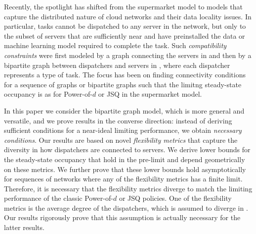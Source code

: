 \documentclass[a4paper, 12pt]{article}
\theoremstyle{definition}
\begin{document}
Recently, the spotlight has shifted from the supermarket model to models that capture the distributed nature of cloud networks and their data locality issues. In particular, tasks cannot be dispatched to any server in the network, but only to the subset of servers that are sufficiently near and have preinstalled the data or machine learning model required to complete the task. Such \emph{compatibility constraints} were first modeled by a graph connecting the servers in \cite{gast2015power,mukherjee2018asymptotically,budhiraja2019supermarket} and then by a bipartite graph between dispatchers and servers in \cite{weng2020boptimal,rutten2022load,rutten2024mean,zhao2022exploiting,zhao2023optimal}, where each dispatcher represents a type of task. The focus has been on finding connectivity conditions for a sequence of graphs or bipartite graphs such that the limitng steady-state occupancy is as for Power-of-$d$ or JSQ in the supermarket model. %

In this paper we consider the bipartite graph model, which is more general and versatile, and we prove results in the converse direction: instead of deriving sufficient conditions for a near-ideal limiting performance, we obtain \emph{necessary conditions}. Our results are based on novel \emph{flexibility metrics} that capture the diversity in how dispatchers are connected to servers. We derive lower bounds for the steady-state occupancy that hold in the pre-limit and depend geometrically on these metrics. We further prove that these lower bounds hold asymptotically for sequences of networks where any of the flexibility metrics has a finite limit. Therefore, it is necessary that the flexibility metrics diverge to match the limiting performance of the classic Power-of-$d$ or JSQ policies. One of the flexibility metrics is the average degree of the dispatchers, which is assumed to diverge in \cite{weng2020boptimal,rutten2022load,rutten2024mean,zhao2022exploiting,zhao2023optimal, mukherjee2018asymptotically, budhiraja2019supermarket}. Our results rigorously prove that this assumption is actually necessary for the latter results.
\end{document}
